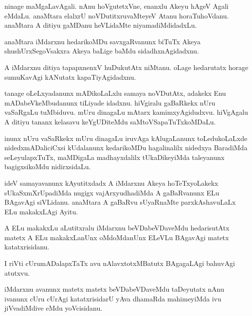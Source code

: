 \documentclass{article}
\begin{document}
\begin{mn}
ninage maMgaLavAgali. nAnu hoVgutetxVne, enanxlu Akeyu hAgeV Agali
eMdaLu. anaMtara elalxrU noVDutitxruvaMteyeV Atanu
horaTuhoVdanu. anaMtara A ditiyu gaMDanu heVLidaMte niyamadiMdidadxLu.
\end{mn}

\begin{mn}
anaMtara iMdarxnu hedarikoMDu savxgaRvanunx biTuTx Akeya
shushUrxSegoVsakxra Akeya baLige baMdu sidadhxnAgidadxnu.
\end{mn}

\begin{mn}
A iMdarxnu ditiya tapapxnenxV huDukutAtx niMtanu. oLage hedarutatx
horage sumuKavAgi kANutatx kapaTiyAgidadxnu.
\end{mn}

\begin{mn}%
tanage oLeLxyadanunx mADikoLaLxlu samaya noVDutAtx, adakekx Enu
mADabeVkeMbudanunx tiLiyade idadxnu. hiVgiralu gaBaRkekx nUru
vaSaRgaLu tuMbiduvu. mUru dinagaLu mAtarx kamimxyAgidudxvu. hiVgAgalu
A ditiyu tananx kelasavu keYgUDiteMdu saMtoVSapaTuTxkoMDaLu.
\end{mn}

\begin{mn}
inunx nUru vaSaRkekx mUru dinagaLu iruvAga kAlugaLanunx toLedukoLaLxde
nidedxmADaliciCxsi kUdalanunx kedarikoMDu hagalinalilx nidedxya
BaradiMda seLeyulapxTuTx, maMDigaLa madhayxdalilx tUkaDikeyiMda
taleyanunx bagigxsikoMdu nidirxsidaLu.
\end{mn}

\begin{mn}
ideV samayavanunx kAyutitxdadx A iMdarxnu Akeya hoTeTxyoLakekx
sUkaSxmXrUpadiMda nugigx vajArxyudhadiMda A gaBaRvanunx ELu BAgavAgi
siVLidanu. anaMtara A gaBaRvu sUyaRnaMte parxkAshavuLaLx ELu
makakxLAgi Ayitu.
\end{mn}

\begin{mn}%
A ELu makakxLu aLutitxralu iMdarxnu beVDabeVDaveMdu hedarisutAtx
matetx A ELu makakxLanUnx oMdoMdanUnx ELeVLu BAgavAgi matetx katatxrisidanu.
\end{mn}

\begin{mn}%
I riVti cUrumADalapxTaTx avu nAlavxtotxMBatutx BAgagaLAgi bahuvAgi atutxvu.
\end{mn}

\begin{mn}
iMdarxnu avanunx matetx matetx beVDabeVDaveMdu taDeyutatx nAnu ivanunx
cUru cUrAgi katatxrisidarU yAva dhamaRda mahimeyiMda ivu jiVvadiMdive
eMdu yoVcisidanu.
\end{mn}
\end{document}
